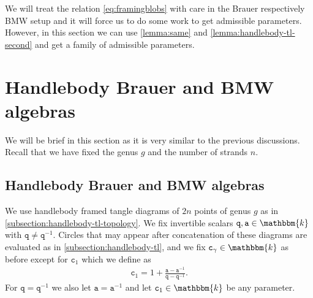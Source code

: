 \documentclass[a4paper,11pt]{amsart}
\newcommand{\KK}{\mathbbm{k}}
\newcommand{\varsym}[1]{\mathtt{#1}}
\newcommand{\qvar}{\varsym{q}}
\newcommand{\cvar}{\varsym{c}}
\newcommand{\avar}{\varsym{a}}
\numberwithin{equation}{section}
\let\fullref\autoref
\begin{document}
\begin{remark}
We will treat the relation \eqref{eq:framingblobs} 
with care in the Brauer respectively BMW setup 
and it will force us to do 
some work to get admissible parameters. However, in this section 
we can use \fullref{lemma:same} and \fullref{lemma:handlebody-tl-second} 
and get a family of admissible parameters.
\end{remark}

\section{Handlebody Brauer and BMW algebras}\label{section:brauer}

We will be brief in this section as it is very similar 
to the previous discussions. Recall that we have fixed the genus $g$ and 
the number of strands $n$.

\subsection{Handlebody Brauer and BMW algebras}\label{subsection:BMW}

We use handlebody framed tangle 
diagrams of $2n$ points 
of genus $g$ as in \fullref{subsection:handlebody-tl-topology}.
We fix invertible scalars 
$\qvar,\avar\in\KK$ with $\qvar\neq\qvar^{-1}$.
Circles that may appear after concatenation of these diagrams 
are evaluated as in \fullref{subsection:handlebody-tl}, and we 
fix $\cvar_{\gamma}\in\KK$ as before except for 
$\cvar_{1}$ which we define as
\begin{gather*}
\cvar_{1}=1+\tfrac{\avar-\avar^{-1}}{\qvar-\qvar^{-1}}.
\end{gather*}
For $\qvar=\qvar^{-1}$ we also let $\avar=\avar^{-1}$
and let $\cvar_{1}\in\KK$ be any parameter.
\end{document}
